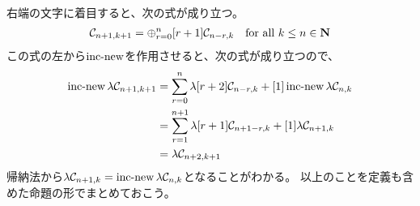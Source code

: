 {\begin{equation*}
\begin{split}
	\end{split}\end{equation*}
	右端の文字に着目すると、次の式が成り立つ。
	\begin{equation*}\begin{split}
		{\mathcal{C}}_{n+1,k+1} = \oplus_{r=0}^n {\mathinner{\left[{r+1}\right]}}{\mathcal{C}}_{n-r,k}
		\quad\text{for all } k\le n\in\mathbf{N}
	\end{split}\end{equation*}
	この式の左から$\mathinner{\operatorname{inc-new}}$を作用させると、次の式が成り立つので、
	\begin{equation*}\begin{split}
		\mathinner{\operatorname{inc-new}}\lambda{\mathcal{C}}_{n+1,k+1} &= \sum_{r=0}^n\lambda[r+2]{\mathcal{C}}_{n-r,k}
			+ [1]\mathinner{\operatorname{inc-new}}\lambda{\mathcal{C}}_{n,k} \\
		&= \sum_{r=1}^{n+1}\lambda[r+1]{\mathcal{C}}_{n+1-r,k} + [1]\lambda{\mathcal{C}}_{n+1,k} \\
		&= \lambda{\mathcal{C}}_{n+2,k+1}
	\end{split}\end{equation*}
	帰納法から$\lambda{\mathcal{C}}_{n+1,k}=\mathinner{\operatorname{inc-new}}\lambda{\mathcal{C}}_{n,k}$となることがわかる。
	以上のことを定義も含めた命題の形でまとめておこう。

}
